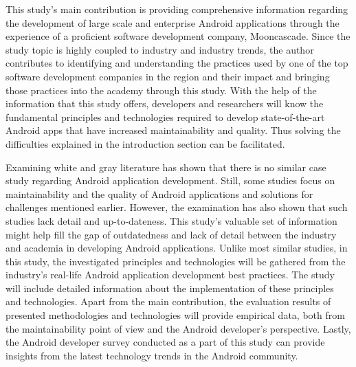 This study's main contribution is providing comprehensive information regarding the development of large scale and enterprise Android applications through the experience of a proficient software development company, Mooncascade. Since the study topic is highly coupled to industry and industry trends, the author contributes to identifying and understanding the practices used by one of the top software development companies in the region and their impact and bringing those practices into the academy through this study. With the help of the information that this study offers, developers and researchers will know the fundamental principles and technologies required to develop state-of-the-art Android apps that have increased maintainability and quality. Thus solving the difficulties explained in the introduction section can be facilitated.

Examining white and gray literature has shown that there is no similar case study regarding Android application development. Still, some studies focus on maintainability and the quality of Android applications and solutions for challenges mentioned earlier. However, the examination has also shown that such studies lack detail and up-to-dateness. This study's valuable set of information might help fill the gap of outdatedness and lack of detail between the industry and academia in developing Android applications. Unlike most similar studies, in this study, the investigated principles and technologies will be gathered from the industry's real-life Android application development best practices. The study will include detailed information about the implementation of these principles and technologies. Apart from the main contribution, the evaluation results of presented methodologies and technologies will provide empirical data, both from the maintainability point of view and the Android developer's perspective. Lastly, the Android developer survey conducted as a part of this study can provide insights from the latest technology trends in the Android community.